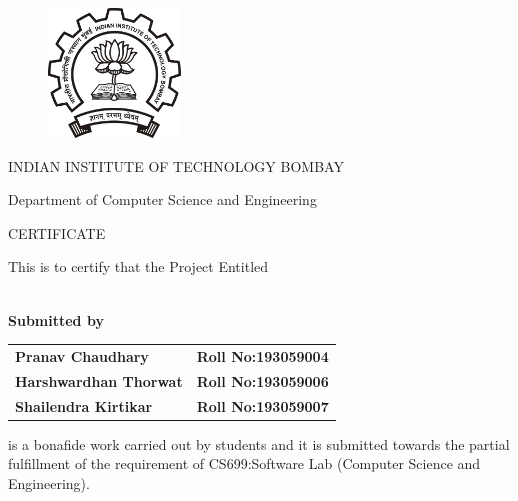 \documentclass[oneside,a4paper,12pt]{article}
\begin{document}
\newpage



\begin{figure}[ht]
\centering
\includegraphics[width=100pt]{assets/iitb_logo.png}
\end{figure}


{\bfseries \fontsize{14}{12} \selectfont \centerline{INDIAN INSTITUTE OF TECHNOLOGY BOMBAY}
\vspace{10pt}
\centerline{Department of Computer Science and Engineering}
\vspace*{2\baselineskip}} 


{\bfseries \fontsize{16}{12} \selectfont \centerline{CERTIFICATE} 
\vspace*{2\baselineskip}} 

\centerline{This is to certify that the Project Entitled}
\vspace*{.5\baselineskip} 

\begin{center}
{\bfseries \fontsize{14}{12} \selectfont {LAB MONITOR}
\vspace*{1\baselineskip}
\\Submitted by
\vspace*{0.5\baselineskip}}

\begin{tabular}{l l}
\bfseries{Pranav Chaudhary}     &  \hspace{10mm}\bfseries{Roll No:193059004}\\
\bfseries{Harshwardhan Thorwat}     &  \hspace{10mm}\bfseries{Roll No:193059006}\\
\bfseries{Shailendra Kirtikar}     &  \hspace{10mm}\bfseries{Roll No:193059007}\\

\end{tabular}
\end{center}

is a bonafide work carried out by students and it
is submitted towards the partial fulfillment of the requirement of CS699:Software Lab (Computer Science and Engineering).\\
\end{document}
